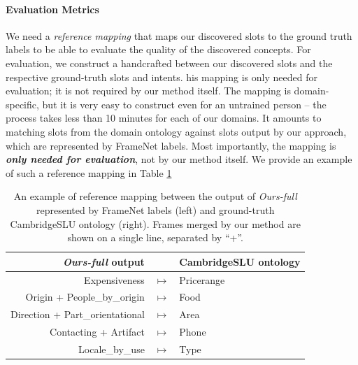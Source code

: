 \paragraph{Evaluation Metrics}
We need a \textit{reference mapping} that maps our discovered slots to the ground truth labels to be able to evaluate the quality of the discovered concepts.
For evaluation, we construct a handcrafted  between our discovered slots and the respective ground-truth slots and intents.
his mapping is only needed for evaluation; it is not required by our method itself.
The mapping is domain-specific, but it is very easy to construct even for an untrained person -- the process takes less than 10 minutes for each of our domains.
It amounts to matching slots from the domain ontology against slots output by our approach, which are represented by FrameNet labels.
Most importantly, the mapping is \textbf{\emph{only needed for evaluation}}, not by our method itself.
We provide an example of such a reference mapping in Table \ref{03:ref_mapping}
\label{sec:app-ref-mapping}

\begin{table}[h!]
    \centering
    \small
    \begin{tabular}{rcl}
    \textbf{\emph{Ours-full} output} & & \textbf{CambridgeSLU ontology}\\\hline
     Expensiveness & $ \mapsto$ & Pricerange\\
     Origin + People\_by\_origin & $ \mapsto$ & Food\\
     Direction + Part\_orientational & $ \mapsto$ & Area\\
     Contacting + Artifact & $ \mapsto$ & Phone\\
     Locale\_by\_use & $ \mapsto$ & Type \\
     

    \end{tabular}
    \caption{An example of reference mapping between the output of \emph{Ours-full} represented by FrameNet labels (left) and ground-truth CambridgeSLU ontology (right).
    Frames merged by our method are shown on a single line, separated by “+”.
    }
    \label{03:ref_mapping}
\end{table}

